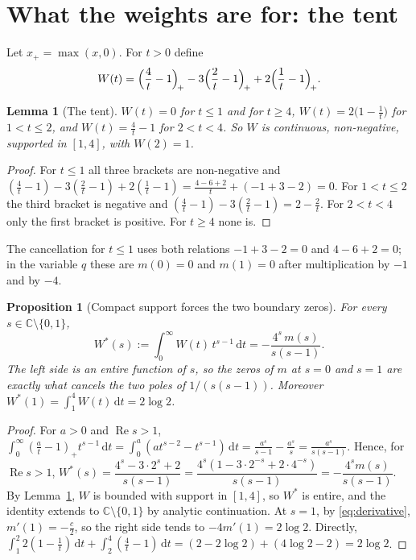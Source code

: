 \documentclass[11pt]{amsart}
\newtheorem{proposition}[theorem]{Proposition}
\newtheorem{lemma}[theorem]{Lemma}
\theoremstyle{definition}
\theoremstyle{remark}
\DeclareMathOperator{\re}{Re}
\newcommand{\C}{\mathbb{C}}
\newcommand{\dd}{\,\mathrm{d}}
\begin{document}
\section{What the weights are for: the tent}\label{sec:tent}

Let $x_+=\max(x,0)$. For $t>0$ define
\begin{equation}\label{eq:tent}
W(t)=\Bigl(\frac4t-1\Bigr)_{\!+}-3\Bigl(\frac2t-1\Bigr)_{\!+}+2\Bigl(\frac1t-1\Bigr)_{\!+}.
\end{equation}

\begin{lemma}[The tent]\label{lem:tent}
$W(t)=0$ for $t\le1$ and for $t\ge4$, $W(t)=2\bigl(1-\tfrac1t\bigr)$ for $1<t\le2$, and
$W(t)=\tfrac4t-1$ for $2<t<4$. So $W$ is continuous, non-negative, supported in $[1,4]$, with
$W(2)=1$.
\end{lemma}

\begin{proof}
For $t\le1$ all three brackets are non-negative and
$(\tfrac4t-1)-3(\tfrac2t-1)+2(\tfrac1t-1)=\tfrac{4-6+2}{t}+(-1+3-2)=0$. For $1<t\le2$ the third
bracket is negative and $(\tfrac4t-1)-3(\tfrac2t-1)=2-\tfrac2t$. For $2<t<4$ only the first
bracket is positive. For $t\ge4$ none is.
\end{proof}

The cancellation for $t\le 1$ uses both relations $-1+3-2=0$ and $4-6+2=0$; in the variable $q$
these are $m(0)=0$ and $m(1)=0$ after multiplication by $-1$ and by $-4$.

\begin{proposition}[Compact support forces the two boundary zeros]\label{prop:mellin}
For every $s\in\C\setminus\{0,1\}$,
\[
W^*(s):=\int_0^\infty W(t)\,t^{s-1}\dd t=-\frac{4^{s}\,m(s)}{s(s-1)} .
\]
The left side is an entire function of $s$, so the zeros of $m$ at $s=0$ and $s=1$ are exactly
what cancels the two poles of $1/(s(s-1))$. Moreover $W^*(1)=\int_1^4W(t)\dd t=2\log 2$.
\end{proposition}

\begin{proof}
For $a>0$ and $\re s>1$,
$\int_0^\infty(\tfrac at-1)_+t^{s-1}\dd t=\int_0^a(at^{s-2}-t^{s-1})\dd t
=\tfrac{a^s}{s-1}-\tfrac{a^s}{s}=\tfrac{a^s}{s(s-1)}$.
Hence, for $\re s>1$,
$W^*(s)=\dfrac{4^s-3\cdot2^s+2}{s(s-1)}=\dfrac{4^s(1-3\cdot2^{-s}+2\cdot4^{-s})}{s(s-1)}
=-\dfrac{4^sm(s)}{s(s-1)}$. By Lemma~\ref{lem:tent}, $W$ is bounded with support in $[1,4]$, so
$W^*$ is entire, and the identity extends to $\C\setminus\{0,1\}$ by analytic continuation. At
$s=1$, by \eqref{eq:derivative}, $m'(1)=-\tfrac c2$, so the right side tends to
$-4m'(1)=2\log2$. Directly,
$\int_1^2 2(1-\tfrac1t)\dd t+\int_2^4(\tfrac4t-1)\dd t=(2-2\log2)+(4\log2-2)=2\log 2$.
\end{proof}
\end{document}
